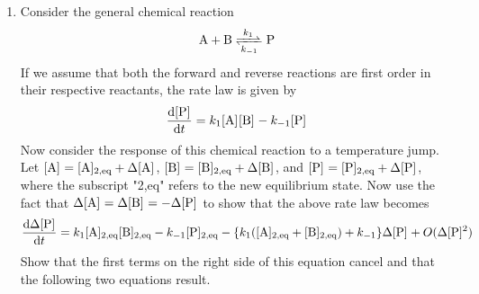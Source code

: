 \documentclass[../psets.tex]{subfiles}
\begin{document}
\begin{enumerate}[label={\textbf{28-\arabic*.}},leftmargin=3.5em]
\begin{proof}[Answer]
\begin{center}
        \end{center}
        The resultant line of best fit has slope approximately equal to 1, which means that
        \begin{align*}
            -(n-1) &= 1\\
            \Aboxed{n &= 2}
        \end{align*}
        It follows by plugging our four data points back into the equation
        \begin{equation*}
            k = \frac{1}{(2-1)t_{1/2}}\frac{2^{2-1}-1}{\cnc[0]{N2O}^{2-1}}
            = \frac{1}{t_{1/2}\cdot\cnc[0]{N2O}}
        \end{equation*}
        and averaging the results that
        \begin{equation*}
            \boxed{k = \SI[per-mode=fraction,fraction-function=\tfrac]{0.47}{\liter\per\mole\per\second}}
        \end{equation*}
    \end{proof}
    \item Consider the general chemical reaction
    \begin{equation*}
        \ce{A + B <=>[$k_1$][$k_{-1}$] P}
    \end{equation*}
    If we assume that both the forward and reverse reactions are first order in their respective reactants, the rate law is given by
    \begin{equation*}
        \dv{\cnc{P}}{t} = k_1\cnc{A}\cnc{B}-k_{-1}\cnc{P}
    \end{equation*}
    Now consider the response of this chemical reaction to a temperature jump. Let $\cnc{A}=\cnc[2,eq]{A}+\Delta\cnc{A}$, $\cnc{B}=\cnc[2,eq]{B}+\Delta\cnc{B}$, and $\cnc{P}=\cnc[2,eq]{P}+\Delta\cnc{P}$, where the subscript "2,eq" refers to the new equilibrium state. Now use the fact that $\Delta\cnc{A}=\Delta\cnc{B}=-\Delta\cnc{P}$ to show that the above rate law becomes
    \begin{equation*}
        \dv{\Delta\cnc{P}}{t} = k_1\cnc[2,eq]{A}\cnc[2,eq]{B}-k_{-1}\cnc[2,eq]{P}-\{k_1(\cnc[2,eq]{A}+\cnc[2,eq]{B})+k_{-1}\}\Delta\cnc{P}+O(\Delta\cnc{P}^2)
    \end{equation*}
    Show that the first terms on the right side of this equation cancel and that the following two equations result.

\end{enumerate}
\end{document}
